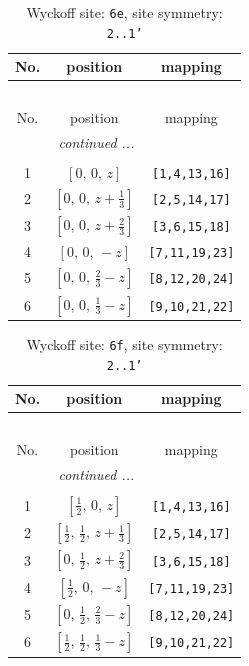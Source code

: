 \documentclass[fleqn,8pt]{jsarticle}
\begin{document}
\renewcommand{\arraystretch}{1.2}
\begin{longtable}{ccc}
\caption{Wyckoff site: {\tt 6e}, site symmetry: {\tt 2..1'}}
 \\
 \hline \hline
No. & position & mapping \\ \hline \endfirsthead

\multicolumn{2}{l}{\tablename\ \thetable{}} \\
 \hline \hline
No. & position & mapping \\ \hline \endhead

 \hline \hline
\multicolumn{2}{r}{\footnotesize\it continued ...} \\ \endfoot

 \hline \hline
\multicolumn{2}{r}{} \\ \endlastfoot

1 & $\left[ 0,\, 0,\, z \right]$ & {\tt [1,4,13,16]} \\ \hline
2 & $\left[ 0,\, 0,\, z + \frac{1}{3} \right]$ & {\tt [2,5,14,17]} \\ \hline
3 & $\left[ 0,\, 0,\, z + \frac{2}{3} \right]$ & {\tt [3,6,15,18]} \\ \hline
4 & $\left[ 0,\, 0,\, - z \right]$ & {\tt [7,11,19,23]} \\ \hline
5 & $\left[ 0,\, 0,\, \frac{2}{3} - z \right]$ & {\tt [8,12,20,24]} \\ \hline
6 & $\left[ 0,\, 0,\, \frac{1}{3} - z \right]$ & {\tt [9,10,21,22]} \\
\end{longtable}
\renewcommand{\arraystretch}{1.2}
\begin{longtable}{ccc}
\caption{Wyckoff site: {\tt 6f}, site symmetry: {\tt 2..1'}}
 \\
 \hline \hline
No. & position & mapping \\ \hline \endfirsthead

\multicolumn{2}{l}{\tablename\ \thetable{}} \\
 \hline \hline
No. & position & mapping \\ \hline \endhead

 \hline \hline
\multicolumn{2}{r}{\footnotesize\it continued ...} \\ \endfoot

 \hline \hline
\multicolumn{2}{r}{} \\ \endlastfoot

1 & $\left[ \frac{1}{2},\, 0,\, z \right]$ & {\tt [1,4,13,16]} \\ \hline
2 & $\left[ \frac{1}{2},\, \frac{1}{2},\, z + \frac{1}{3} \right]$ & {\tt [2,5,14,17]} \\ \hline
3 & $\left[ 0,\, \frac{1}{2},\, z + \frac{2}{3} \right]$ & {\tt [3,6,15,18]} \\ \hline
4 & $\left[ \frac{1}{2},\, 0,\, - z \right]$ & {\tt [7,11,19,23]} \\ \hline
5 & $\left[ 0,\, \frac{1}{2},\, \frac{2}{3} - z \right]$ & {\tt [8,12,20,24]} \\ \hline
6 & $\left[ \frac{1}{2},\, \frac{1}{2},\, \frac{1}{3} - z \right]$ & {\tt [9,10,21,22]} \\
\end{longtable}
\end{document}
